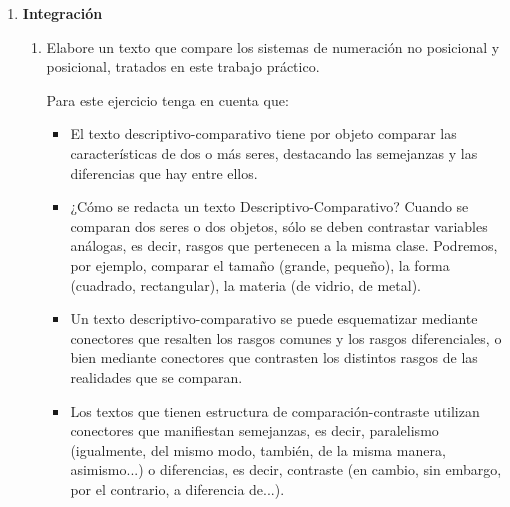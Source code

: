 \documentclass[12pt]{article}
\begin{document}
\begin{enumerate}
\begin{enumerate}
\begin{enumerate}
            \end{enumerate}

        \end{enumerate}

    \item \textbf{Integración}

        \begin{enumerate}

            \item Elabore un texto que compare los sistemas de numeración no
                posicional y posicional, tratados en este trabajo
                práctico.

                Para este ejercicio tenga en cuenta que:

                \begin{itemize}

                    \item El texto descriptivo-comparativo tiene por objeto
                        comparar las características de dos o más seres,
                        destacando las semejanzas y las diferencias que hay
                        entre ellos.

                    \item ¿Cómo se redacta un texto Descriptivo-Comparativo?
                        Cuando se comparan dos seres o dos objetos, sólo se
                        deben contrastar variables análogas, es decir, rasgos
                        que pertenecen a la misma clase. Podremos, por
                        ejemplo, comparar el tamaño (grande, pequeño), la
                        forma (cuadrado, rectangular), la materia (de vidrio,
                        de metal).

                    \item Un texto descriptivo-comparativo se puede
                        esquematizar mediante conectores que resalten los
                        rasgos comunes y los rasgos diferenciales, o bien
                        mediante conectores que contrasten los distintos
                        rasgos de las realidades que se comparan.

                    \item Los textos que tienen estructura de
                        comparación-contraste utilizan conectores que
                        manifiestan semejanzas, es decir, paralelismo
                        (igualmente, del mismo modo, también, de la misma
                        manera, asimismo...) o diferencias, es decir,
                        contraste (en cambio, sin embargo, por el contrario, a
                        diferencia de...).


\end{itemize}
\end{enumerate}
\end{enumerate}
\end{document}
